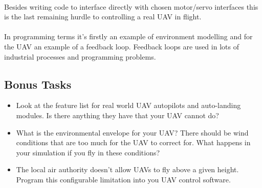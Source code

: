 \documentclass[11pt]{book}
\begin{document}
\paragraph{} Besides writing code to interface directly with chosen motor/servo interfaces this is the last remaining hurdle to controlling a real UAV in flight.

\paragraph{} In programming terms it's firstly an example of environment modelling and for the UAV an example of a feedback loop. Feedback loops are used in lots of industrial processes and programming problems.

\subsection{Bonus Tasks}

\begin{itemize}
\item Look at the feature list for real world UAV autopilots and auto-landing modules. Is there anything they have that your UAV cannot do?
\item What is the environmental envelope for your UAV? There should be wind conditions that are too much for the UAV to correct for. What happens in your simulation if you fly in these conditions?
\item The local air authority doesn't allow UAVs to fly above a given height. Program this configurable limitation into you UAV control software.
\end{itemize}
\end{document}
